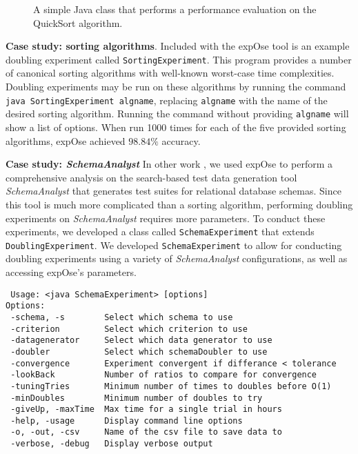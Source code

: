 \documentclass[10pt,twocolumn]{article}
\newcommand{\toolname}{{\sc expOse}\xspace}
\begin{document}
    
    \begin{figure}[t]
    
    \vspace{-0.15in}
    \caption{A simple Java class that performs a performance evaluation
    on the QuickSort algorithm.}\vspace{-0.20in}
    \label{fig:qsprogram}
    \end{figure}

    {\bf Case study: sorting algorithms}.
    \lstset{language=bash}
    Included with the \toolname tool is an example doubling
    experiment called \texttt{SortingExperiment}.  This program provides a number
    of canonical sorting algorithms with well-known worst-case time
    complexities.  Doubling experiments may be run on these algorithms
    by running the command \texttt{java SortingExperiment algname},
    replacing \texttt{algname} with the name of the desired sorting
    algorithm. Running the command without providing \texttt{algname}
    will show a list of options. When run 1000 times for each of the
    five provided sorting algorithms, \toolname achieved $98.84\%$
    accuracy.

    {\bf Case study: \textit{SchemaAnalyst}}
    In other work \cite{kinneer2015}, we used \toolname to perform a
    comprehensive analysis on the search-based test data generation 
    tool \textit{SchemaAnalyst} \cite{kapfhammer2013} that generates
    test suites for relational database schemas. Since this tool is much 
    more complicated than a sorting algorithm, performing doubling experiments on
    \textit{SchemaAnalyst} requires more parameters.  To conduct these
    experiments, we developed a class called \texttt{SchemaExperiment}
    that extends \texttt{DoublingExperiment}.  We developed 
    \texttt{SchemaExperiment} to allow for conducting doubling
    experiments using a variety of \textit{SchemaAnalyst} configurations,
    as well as accessing \toolname's parameters.

{\scriptsize
\begin{verbatim}
 Usage: <java SchemaExperiment> [options]
Options:  
 -schema, -s        Select which schema to use 
 -criterion         Select which criterion to use 
 -datagenerator     Select which data generator to use 
 -doubler           Select which schemaDoubler to use 
 -convergence       Experiment convergent if differance < tolerance 
 -lookBack          Number of ratios to compare for convergence 
 -tuningTries       Minimum number of times to doubles before O(1)  
 -minDoubles        Minimum number of doubles to try 
 -giveUp, -maxTime  Max time for a single trial in hours 
 -help, -usage      Display command line options 
 -o, -out, -csv     Name of the csv file to save data to 
 -verbose, -debug   Display verbose output 
\end{verbatim}
}
\end{document}
